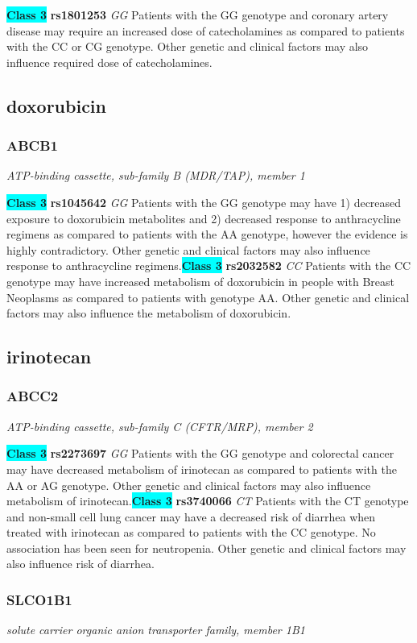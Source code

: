 \documentclass{report}
\begin{document}
\textbf{\colorbox{cyan} {Class 3}} \textbf{ rs1801253 } \textit{ GG }
Patients with the GG genotype and coronary artery disease may require an increased dose of catecholamines as compared to patients with the CC or CG genotype. Other genetic and clinical factors may also influence required dose of catecholamines.\newline\subsection{ doxorubicin }\subsubsection{ ABCB1 }
\textit{ ATP-binding cassette, sub-family B (MDR/TAP), member 1 }

\textbf{\colorbox{cyan} {Class 3}} \textbf{ rs1045642 } \textit{ GG }
Patients with the GG genotype may have 1) decreased exposure to doxorubicin metabolites and 2) decreased response to anthracycline regimens as compared to patients with the AA genotype, however the evidence is highly contradictory. Other genetic and clinical factors may also influence response to anthracycline regimens.\newline\textbf{\colorbox{cyan} {Class 3}} \textbf{ rs2032582 } \textit{ CC }
Patients with the  CC genotype may have increased metabolism of doxorubicin in people with Breast Neoplasms as compared to patients with genotype AA. Other genetic and clinical factors may also influence the metabolism of doxorubicin.\newline\subsection{ irinotecan }\subsubsection{ ABCC2 }
\textit{ ATP-binding cassette, sub-family C (CFTR/MRP), member 2 }

\textbf{\colorbox{cyan} {Class 3}} \textbf{ rs2273697 } \textit{ GG }
Patients with the GG genotype and colorectal cancer may have decreased metabolism of irinotecan as compared to patients with the AA or AG genotype. Other genetic and clinical factors may also influence metabolism of irinotecan.\newline\textbf{\colorbox{cyan} {Class 3}} \textbf{ rs3740066 } \textit{ CT }
Patients with the CT genotype and non-small cell lung cancer may have a decreased risk of diarrhea when treated with irinotecan as compared to patients with the CC genotype. No association has been seen for neutropenia. Other genetic and clinical factors may also influence risk of diarrhea.\newline\subsubsection{ SLCO1B1 }
\textit{ solute carrier organic anion transporter family, member 1B1 }
\end{document}
